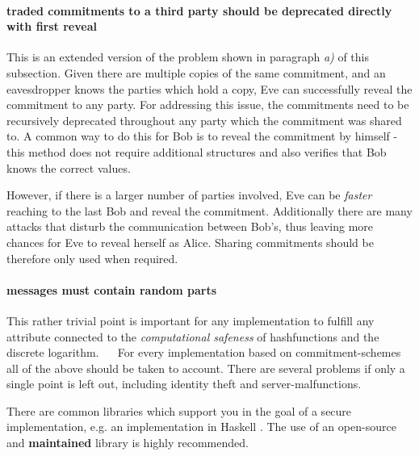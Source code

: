	\paragraph{traded commitments to a third party should be deprecated directly with first reveal} This is an extended version of the problem shown in paragraph \textit{a)} of this subsection. Given there are multiple copies of the same commitment, and an eavesdropper knows the parties which hold a copy, Eve can successfully reveal the commitment to any party. For addressing this issue, the commitments need to be recursively deprecated throughout any party which the commitment was shared to. A common way to do this for Bob is to reveal the commitment by himself - this method does not require additional structures and also verifies that Bob knows the correct values. 
	
	However, if there is a larger number of parties involved, Eve can be \textit{faster} reaching to the last Bob and reveal the commitment. Additionally there are many attacks that disturb the communication between Bob's, thus leaving more chances for Eve to reveal herself as Alice. Sharing commitments should be therefore only used when required. 
	\paragraph{messages must contain random parts} This rather trivial point is important for any implementation to fulfill any attribute connected to the \textit{computational safeness} of hashfunctions and the discrete logarithm.  
~\newline ~\newline
For every implementation based on commitment-schemes all of the above should be taken to account. There are several problems if only a single point is left out, including identity theft and server-malfunctions. 

There are common libraries which support you in the goal of a secure implementation, e.g. an implementation in Haskell \cite{b0} . The use of an open-source and \textbf{maintained} library is highly recommended.